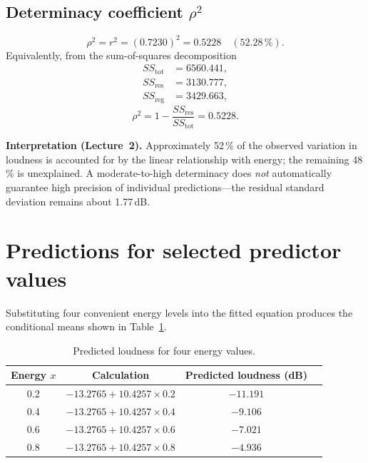 \documentclass[11pt,a4paper]{article}
\begin{document}
\subsection{Determinacy coefficient \texorpdfstring{$\rho^2$}{rho-squared}}

\begin{equation}
  \rho^2 = r^2 = (0.7230)^2 = 0.5228 \quad (52.28\,\%).
\end{equation}
Equivalently, from the sum-of-squares decomposition
\begin{align*}
  SS_{\mathrm{tot}} &= 6560.441, \\
  SS_{\mathrm{res}} &= 3130.777, \\
  SS_{\mathrm{reg}} &= 3429.663,
\end{align*}
\begin{equation}
  \rho^2 = 1 - \frac{SS_{\mathrm{res}}}{SS_{\mathrm{tot}}} = 0.5228 .
\end{equation}

\textbf{Interpretation (Lecture~2).} Approximately 52\,\% of the observed
variation in loudness is accounted for by the linear relationship with energy;
the remaining 48\,\% is unexplained. A moderate-to-high determinacy does
\emph{not} automatically guarantee high precision of individual
predictions---the residual standard deviation remains about 1.77\,dB.

\section{Predictions for selected predictor values}

Substituting four convenient energy levels into the fitted equation produces
the conditional means shown in Table~\ref{tab:pred}.

\begin{table}[H]
\centering
\caption{Predicted loudness for four energy values.}
\label{tab:pred}
\begin{tabular}{cccc}
\toprule
Energy $x$ & Calculation & Predicted loudness (dB) \\
\midrule
0.2 & $-13.2765 + 10.4257 \times 0.2$ & $-11.191$ \\
0.4 & $-13.2765 + 10.4257 \times 0.4$ & $-9.106$  \\
0.6 & $-13.2765 + 10.4257 \times 0.6$ & $-7.021$  \\
0.8 & $-13.2765 + 10.4257 \times 0.8$ & $-4.936$  \\
\bottomrule
\end{tabular}
\end{table}
\end{document}
